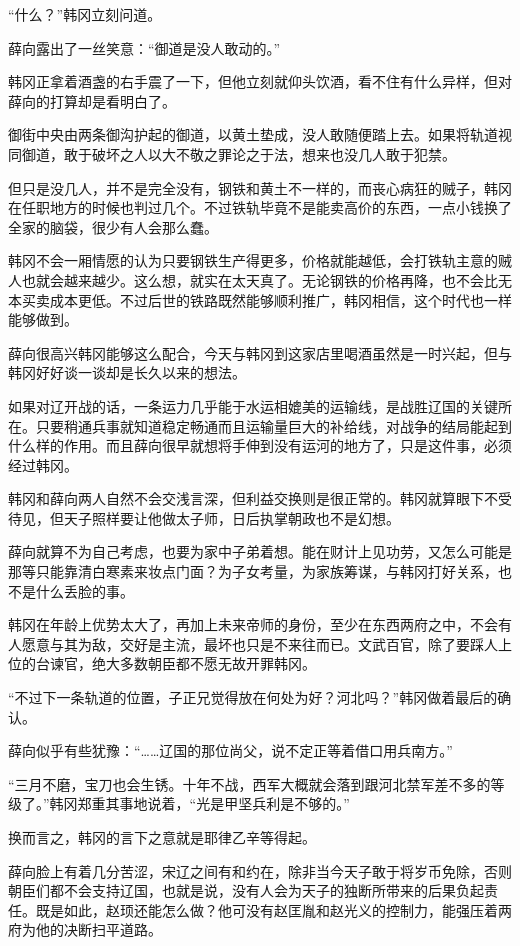 “什么？”韩冈立刻问道。 

薛向露出了一丝笑意：“御道是没人敢动的。” 

韩冈正拿着酒盏的右手震了一下，但他立刻就仰头饮酒，看不住有什么异样，但对薛向的打算却是看明白了。 

御街中央由两条御沟护起的御道，以黄土垫成，没人敢随便踏上去。如果将轨道视同御道，敢于破坏之人以大不敬之罪论之于法，想来也没几人敢于犯禁。 

但只是没几人，并不是完全没有，钢铁和黄土不一样的，而丧心病狂的贼子，韩冈在任职地方的时候也判过几个。不过铁轨毕竟不是能卖高价的东西，一点小钱换了全家的脑袋，很少有人会那么蠢。 

韩冈不会一厢情愿的认为只要钢铁生产得更多，价格就能越低，会打铁轨主意的贼人也就会越来越少。这么想，就实在太天真了。无论钢铁的价格再降，也不会比无本买卖成本更低。不过后世的铁路既然能够顺利推广，韩冈相信，这个时代也一样能够做到。 

薛向很高兴韩冈能够这么配合，今天与韩冈到这家店里喝酒虽然是一时兴起，但与韩冈好好谈一谈却是长久以来的想法。 

如果对辽开战的话，一条运力几乎能于水运相媲美的运输线，是战胜辽国的关键所在。只要稍通兵事就知道稳定畅通而且运输量巨大的补给线，对战争的结局能起到什么样的作用。而且薛向很早就想将手伸到没有运河的地方了，只是这件事，必须经过韩冈。 

韩冈和薛向两人自然不会交浅言深，但利益交换则是很正常的。韩冈就算眼下不受待见，但天子照样要让他做太子师，日后执掌朝政也不是幻想。 

薛向就算不为自己考虑，也要为家中子弟着想。能在财计上见功劳，又怎么可能是那等只能靠清白寒素来妆点门面？为子女考量，为家族筹谋，与韩冈打好关系，也不是什么丢脸的事。 

韩冈在年龄上优势太大了，再加上未来帝师的身份，至少在东西两府之中，不会有人愿意与其为敌，交好是主流，最坏也只是不来往而已。文武百官，除了要踩人上位的台谏官，绝大多数朝臣都不愿无故开罪韩冈。 

“不过下一条轨道的位置，子正兄觉得放在何处为好？河北吗？”韩冈做着最后的确认。 

薛向似乎有些犹豫：“……辽国的那位尚父，说不定正等着借口用兵南方。” 

“三月不磨，宝刀也会生锈。十年不战，西军大概就会落到跟河北禁军差不多的等级了。”韩冈郑重其事地说着，“光是甲坚兵利是不够的。” 

换而言之，韩冈的言下之意就是耶律乙辛等得起。 

薛向脸上有着几分苦涩，宋辽之间有和约在，除非当今天子敢于将岁币免除，否则朝臣们都不会支持辽国，也就是说，没有人会为天子的独断所带来的后果负起责任。既是如此，赵顼还能怎么做？他可没有赵匡胤和赵光义的控制力，能强压着两府为他的决断扫平道路。 

